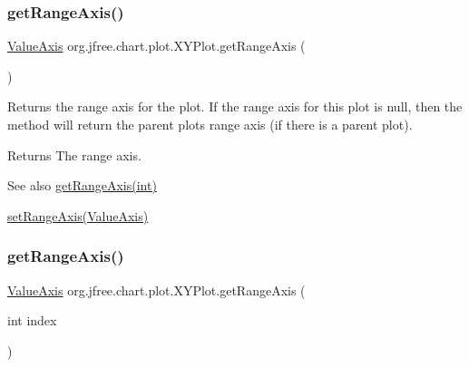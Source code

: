 \subsubsection{\texorpdfstring{get\+Range\+Axis()}{getRangeAxis()}\hspace{0.1cm}{\footnotesize\ttfamily [1/2]}}
{\footnotesize\ttfamily \mbox{\hyperlink{classorg_1_1jfree_1_1chart_1_1axis_1_1_value_axis}{Value\+Axis}} org.\+jfree.\+chart.\+plot.\+X\+Y\+Plot.\+get\+Range\+Axis (\begin{DoxyParamCaption}{ }\end{DoxyParamCaption})}

Returns the range axis for the plot. If the range axis for this plot is {\ttfamily null}, then the method will return the parent plot\textquotesingle{}s range axis (if there is a parent plot).

\begin{DoxyReturn}{Returns}
The range axis.
\end{DoxyReturn}
\begin{DoxySeeAlso}{See also}
\mbox{\hyperlink{classorg_1_1jfree_1_1chart_1_1plot_1_1_x_y_plot_a7da52aa2199931e72806da92b56e4dc2}{get\+Range\+Axis(int)}} 

\mbox{\hyperlink{classorg_1_1jfree_1_1chart_1_1plot_1_1_x_y_plot_ad1e4454ba3a7289dd46f705fbd0db983}{set\+Range\+Axis(\+Value\+Axis)}} 
\end{DoxySeeAlso}
\mbox{\label{classorg_1_1jfree_1_1chart_1_1plot_1_1_x_y_plot_a7da52aa2199931e72806da92b56e4dc2}} 
\subsubsection{\texorpdfstring{get\+Range\+Axis()}{getRangeAxis()}\hspace{0.1cm}{\footnotesize\ttfamily [2/2]}}
{\footnotesize\ttfamily \mbox{\hyperlink{classorg_1_1jfree_1_1chart_1_1axis_1_1_value_axis}{Value\+Axis}} org.\+jfree.\+chart.\+plot.\+X\+Y\+Plot.\+get\+Range\+Axis (\begin{DoxyParamCaption}\item[{int}]{index }\end{DoxyParamCaption})}

